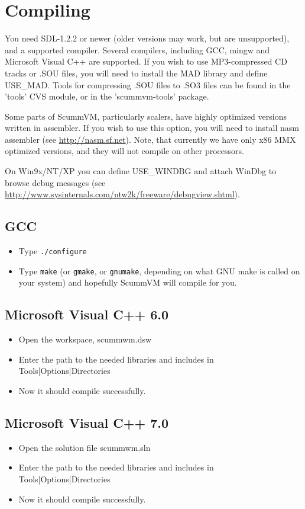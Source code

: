 

\section{Compiling}

You need SDL-1.2.2 or newer (older versions may work, but are unsupported), and
a supported compiler. Several compilers, including GCC, mingw and Microsoft
Visual C++ are supported. If you wish to use MP3-compressed CD tracks or
.SOU files, you will need to install the MAD library and define
USE\_MAD. Tools for compressing .SOU files to .SO3 files can be
found in the 'tools' CVS module, or in the 'scummvm-tools' package.

Some parts of ScummVM, particularly scalers, have highly optimized versions 
written in assembler. If you wish to use this option, you will need to install 
nasm assembler (see \url{http://nasm.sf.net}). Note, that currently we have only x86
MMX optimized versions, and they will not compile on other processors.

On Win9x/NT/XP you can define USE\_WINDBG and attach WinDbg to browse debug 
messages (see \url{http://www.sysinternals.com/ntw2k/freeware/debugview.shtml}).

\subsection{GCC}
  \begin{itemize}
  \item Type \texttt{./configure}
  \item Type \texttt{make} (or \texttt{gmake}, or \texttt{gnumake}, depending
        on what GNU make is called on your system) and hopefully ScummVM will
        compile for you.
  \end{itemize}
\subsection{Microsoft Visual C++ 6.0}
  \begin{itemize}
  \item Open the workspace, scummwm.dsw
  \item Enter the path to the needed libraries and includes in
    Tools|Options|Directories
  \item Now it should compile successfully. 
  \end{itemize}
\subsection{Microsoft Visual C++ 7.0}
  \begin{itemize}
  \item Open the solution file scummwm.sln
  \item Enter the path to the needed libraries and includes in
    Tools|Options|Directories
  \item Now it should compile successfully. 
  \end{itemize}
